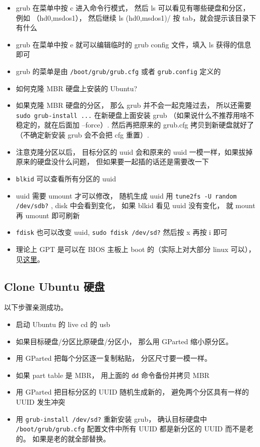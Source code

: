 \begin{itemize}
\item grub 在菜单中按 c 进入命令行模式， 然后 ls 可以看见有哪些硬盘和分区， 例如 （hd0,msdos1）， 然后继续 ls (hd0,msdos1)/ 按 tab，就会提示该目录下有什么
\item grub 在菜单中按 e 就可以编辑临时的 grub config 文件，填入 ls 获得的信息即可
\item grub 的菜单是由 \verb|/boot/grub/grub.cfg| 或者 \verb|grub.config| 定义的
\item 如何克隆 MBR 硬盘上安装的 Ubuntu?
\item 如果克隆 MBR 硬盘的分区， 那么 grub 并不会一起克隆过去， 所以还需要 \verb|sudo grub-install ...| 在新硬盘上面安装 grub （如果说什么不推荐用啥不稳定的，就在后面加 --force）. 然后再把原来的 grub.cfg 拷贝到新硬盘就好了（不确定新安装 grub 会不会把 cfg 重置）.
\item 注意克隆分区以后， 目标分区的 uuid 会和原来的 uuid 一模一样，如果拔掉原来的硬盘没什么问题， 但如果要一起插的话还是需要改一下
\item \verb|blkid| 可以查看所有分区的 uuid
\item uuid 需要 umount 才可以修改， 随机生成 uuid 用 \verb|tune2fs -U random /dev/sdb?| , disk 中会看到变化， 如果 blkid 看见 uuid 没有变化， 就 mount 再 umount 即可刷新
\item \verb|fdisk| 也可以改变 uuid, \verb|sudo fdisk /dev/sd?| 然后按 x 再按 i 即可
\item 理论上 GPT 是可以在 BIOS 主板上 boot 的（实际上对大部分 linux 可以）， 见\href{https://superuser.com/questions/1337344/is-it-possible-to-boot-linux-from-a-gpt-disk-on-a-bios-system}{这里}。
\end{itemize}

\subsection{Clone Ubuntu 硬盘}
以下步骤亲测成功。
\begin{itemize}
\item 启动 Ubuntu 的 live cd 的 usb
\item 如果目标硬盘/分区比原硬盘/分区小， 那么用 GParted 缩小原分区。
\item 用 GParted 把每个分区逐一复制粘贴， 分区尺寸要一模一样。
\item 如果 part table 是 MBR， 用上面的 \verb|dd| 命令备份并拷贝 MBR
\item 用 GParted 把目标分区的 UUID 随机生成新的， 避免两个分区具有一样的 UUID 发生冲突
\item 用 \verb|grub-install /dev/sd?| 重新安装 grub， 确认目标硬盘中 \verb|/boot/grub/grub.cfg| 配置文件中所有 UUID 都是新分区的 UUID 而不是老的。 如果是老的就全部替换。
\end{itemize}

